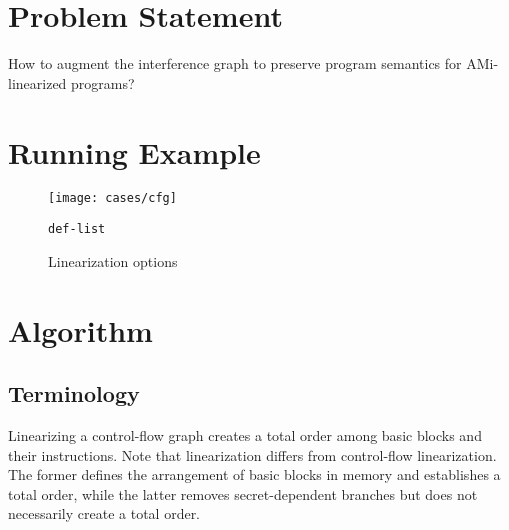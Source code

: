 \documentclass[12pt]{article}
\begin{document}
\section{Problem Statement}

How to augment the interference graph to preserve program semantics for AMi-linearized programs?

\pagebreak

\section{Running Example}

\begin{figure}[h!]
  \centering
  \texttt{[image: cases/cfg]}
  \caption{\texttt{def-list} }
\end{figure}

\begin{figure}[h!]
  \centering
   \hfill
  \caption{Linearization options}
  \label{fig:linearization-options}
\end{figure}

\section{Algorithm}

\subsection{Terminology}

Linearizing a control-flow graph creates a total order among basic blocks and their instructions. Note that linearization differs from control-flow linearization. The former defines the arrangement of basic blocks in memory and establishes a total order, while the latter removes secret-dependent branches but does not necessarily create a total order.


\end{document}
